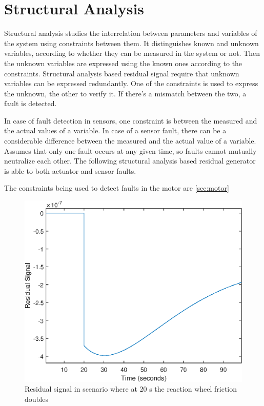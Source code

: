 \section{Structural Analysis}

\label{sec:structural}

Structural analysis studies the interrelation between parameters and variables of the system using constraints between them. It distinguishes known and unknown variables, according to whether they can be measured in the system or not. Then the unknown variables are expressed using the known ones according to the constraints. Structural analysis based residual signal require that unknown variables can be expressed redundantly. One of the constraints is used to express the unknown, the other to verify it. If there's a mismatch between the two, a fault is detected.

In case of fault detection in sensors, one constraint is between the measured and the actual values of a variable. In case of a sensor fault, there can be a considerable difference between the measured and the actual value of a variable. Assumes that only one fault occurs at any given time, so faults cannot mutually neutralize each other. The following structural analysis based residual generator is able to both actuator and sensor faults.

The constraints being used to detect faults in the motor are \ref{sec:motor} 

\begin{figure}
	\centering
	\includegraphics[width=120mm]{figures/residual_Noreconfig}
	\caption{Residual signal in scenario where at 20 s the reaction wheel friction doubles}
	\label{fig:rwFaultRes}
\end{figure} 

